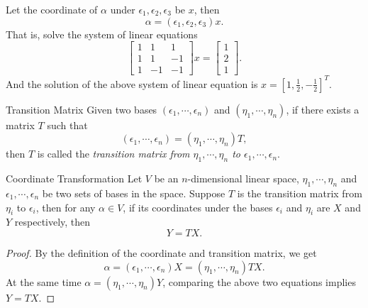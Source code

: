 \begin{solution}
  Let the coordinate of $\alpha$ under $\epsilon_1,\epsilon_2,\epsilon_3$ be
  $x$, then
  \begin{equation}
    \alpha = (\epsilon_1,\epsilon_2,\epsilon_3)x.
  \end{equation}
  That is, solve the system of linear equations
  \begin{equation}
    \begin{bmatrix}
      1 & 1 & 1\\
      1 & 1 & -1\\
      1 & -1 & -1
    \end{bmatrix}x =
    \begin{bmatrix}
      1\\
      2\\
      1
    \end{bmatrix}.
  \end{equation}
  And the solution of the above system of linear equation is $x = [1,
  \frac{1}{2}, - \frac{1}{2}]^T$.
\end{solution}

\begin{definition}{Transition Matrix}{}
  Given two bases $(\epsilon_1, \cdots, \epsilon_n)$
  and $(\eta_1, \cdots, \eta_n)$, if there exists a matrix $T$ such that
  \begin{equation}
    (\epsilon_1, \cdots, \epsilon_n) = (\eta_1, \cdots, \eta_n)T,
  \end{equation}
  then $T$ is called the \emph{transition matrix from $\eta_1, \cdots, \eta_n$
  to $\epsilon_1, \cdots, \epsilon_n$}.
\end{definition}

\begin{proposition}{Coordinate Transformation}{}
  Let $V$ be an $n$-dimensional linear space, $\eta_1,\cdots,\eta_n$ and
  $\epsilon_1,\cdots, \epsilon_n$ be two sets of bases in the space.
  Suppose $T$ is the transition matrix from $\eta_i$ to $\epsilon_i$,
  then for any $\alpha \in V$, if its coordinates under the bases $\epsilon_i$
  and $\eta_i$ are $X$ and $Y$ respectively, then
  \begin{equation}
    Y = TX.
  \end{equation}
\end{proposition}

\begin{proof}
  By the definition of the coordinate and transition matrix, we get
  \begin{equation}
    \alpha = (\epsilon_1,\cdots,\epsilon_n)X
    = (\eta_1,\cdots,\eta_n)TX.
  \end{equation}
  At the same time $\alpha = (\eta_1,\cdots,\eta_n)Y$,
  comparing the above two equations implies $Y = TX$.
\end{proof}

